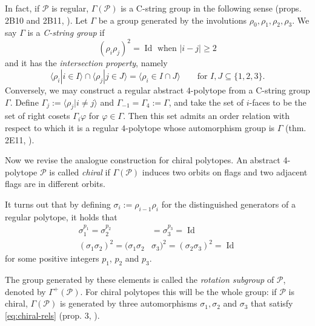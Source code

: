 \documentclass{article}
\theoremstyle{definition}
\newcommand{\p}{\mathcal{P}}
\DeclareMathOperator{\Id}{Id}
\begin{document}
	In fact, if $\p$ is regular, $\Gamma(\p)$ is a C-string group in the following sense (props. 2B10 and 2B11, \cite{abstract-polytopes}). Let $\Gamma$ be a group generated by the involutions $\rho_0,\rho_1,\rho_2,\rho_3$. We say $\Gamma$ is a \textit{C-string group} if
	\[(\rho_i\rho_j)^2=\Id\text{ when } |i-j|\geq2\]
	and it has the \textit{intersection property}, namely
	\[\langle \rho_i|i\in I\rangle\cap\langle\rho_j|j\in J\rangle=\langle\rho_i\in I\cap J\rangle\qquad\text{for }I,J\subseteq\{1,2,3\}.\]
	Conversely, we may construct a regular abstract $4$-polytope from a C-string group $\Gamma$. Define $\Gamma_j:=\langle\rho_j|i\neq j\rangle$ and $\Gamma_{-1}=\Gamma_4:=\Gamma$, and take the set of $i$-faces to be the set of right cosets $\Gamma_i\varphi$ for $\varphi\in\Gamma$. Then this set admits an order relation with respect to which it is a regular $4$-polytope whose automorphism group is $\Gamma$ (thm. 2E11, \cite{abstract-polytopes}).
	
	\vspace{.5cm}
	
	Now we revise the analogue construction for chiral polytopes. An abstract 4-polytope $\p$ is called \textit{chiral} if $\Gamma(\p)$ induces two orbits on flags and two adjacent flags are in different orbits.
	
	It turns out that by defining $\sigma_i:=\rho_{i-1}\rho_i$ for the distinguished generators of a regular polytope, it holds that
	\begin{equation}\label{eq:chiral-rels}
		\begin{aligned}
			\sigma_1^{p_1}=\sigma_2^{p_2}&=\sigma_3^{p_3}=\Id\\
			(\sigma_1\sigma_2)^2=(\sigma_1\sigma_2&\sigma_3)^2=(\sigma_2\sigma_3)^2=\Id
		\end{aligned}
	\end{equation}
	for some positive integers $p_1$, $p_2$ and $p_3$.
	
	The group generated by these elements is called the \textit{rotation subgroup} of $\p$, denoted by $\Gamma^+(\p)$. For chiral polytopes this will be the whole group: if $\p$ is chiral, $\Gamma(\p)$ is generated by three automorphisms $\sigma_1,\sigma_2$ and $\sigma_3$ that satisfy \cref{eq:chiral-rels} (prop. 3, \cite{schulte-chiral}).
	
\end{document}
